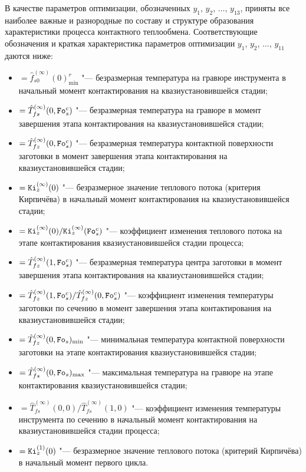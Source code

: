 В качестве параметров оптимизации, обозначенных $y_1$, $y_2$,  $\ldots$, $y_{13}$,
приняты все наиболее важные и разнородные по составу и структуре образования характеристики процесса контактного теплообмена. Соответствующие обозначения и краткая характеристика параметров оптимизации $y_1$, $y_2$, $\ldots$, $y_{11} $
даются ниже:
\begin{itemize}
\item[$y_1$]  $=\hat {f}_{s0}^{(\infty )} (0)_{\min}^r$ "--- безразмерная температура на гравюре инструмента в начальный момент контактирования на квазиустановившейся стадии;
\item[$y_2$]  $=\hat {T}_{fs}^{(\infty )} (0,{\tt Fo}_s^c )$ "--- безразмерная температура на гравюре в момент завершения этапа контактирования на квазиустановившейся стадии; 
\item[$y_3$]   $ =\hat {T}_{fz}^{(\infty )} (0,{\tt Fo}_s^c )$ "--- безразмерная температура контактной поверхности
заготовки в момент завершения этапа контактирования на квазиустановившейся стадии; 
\item[$y_4$]  $ ={\tt Ki}_z^{(\infty )} (0)$ "--- безразмерное значение теплового потока (критерия Кирпичёва) в
начальный момент контактирования на квазиустановившейся стадии;
\item[$y_5$]   $ ={{\tt Ki}_z^{(\infty )}(0)}/{{\tt Ki}_z^{(\infty )} ({\tt Fo}_s^c )}$ "--- коэффициент изменения
теплового потока на этапе контактирования квазиустановившейся стадии процесса; 
\item[$y_6$]  $ =\hat {T}_{fz}^{(\infty )} (1,{\tt Fo}_s^c )$ "--- безразмерная температура центра заготовки в момент завершения этапа контактирования на квазиустановившейся стадии; 
\item[$y_7$]  $ ={\hat {T}_{fz}^{(\infty )} (1,{\tt Fo}_s^c )}/{\hat {T}_{fz}^{(\infty )} (0,{\tt Fo}_s^c )}$ "--- коэффициент изменения температуры заготовки по сечению в момент завершения этапа контактирования на квазиустановившейся стадии; 
\item[$y_8$]  $=\hat {T}_{fz}^{(\infty )} (0,{\tt Fo}_s )_{\min } $ "--- минимальная температура контактной поверхности заготовки на этапе контактирования квазиустановившейся стадии;
\item[$y_9$]    $=\hat {T}_{fs}^{(\infty )} (0,{\tt Fo}_s )_{\max } $ "--- максимальная температура на гравюре на этапе контактирования квазиустановившейся стадии; 
\item[$y_{10}$]  $ ={\hat {T}_{fs}^{(\infty )} (0,0)}/{\hat {T}_{fs}^{(\infty )} (1,0)}$ "---
коэффициент изменения температуры инструмента по сечению в начальный момент контактирования на квазиустановившейся стадии процесса; 
\item[$y_{11}$]  $ ={\tt Ki}_z^{(1)} (0)$ "--- безразмерное значение теплового потока (критерий Кирпичёва) в начальный момент первого цикла.
\end{itemize}

